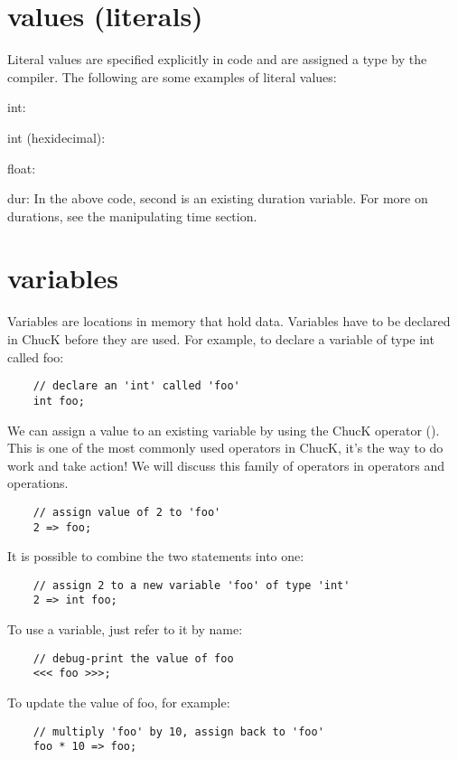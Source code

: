 \section{values (literals)}

Literal values are specified explicitly in code and are assigned a type by the compiler. The following are some examples of literal values:

int:

int (hexidecimal):

float:

dur:
 In the above code, second is an existing duration variable. For more on durations, see the manipulating time section.


\section{variables}

Variables are locations in memory that hold data. Variables have to be declared in ChucK before they are used. For example, to declare a variable of type int called foo:
\begin{verbatim}
    // declare an 'int' called 'foo'
    int foo;
\end{verbatim}

We can assign a value to an existing variable by using the ChucK operator (\chuckop). This is one of the most commonly used operators in ChucK, it's the way to do work and take action! We will discuss this family of operators in operators and operations.
\begin{verbatim}
    // assign value of 2 to 'foo'
    2 => foo;
\end{verbatim}

It is possible to combine the two statements into one:
\begin{verbatim}
    // assign 2 to a new variable 'foo' of type 'int'
    2 => int foo;
\end{verbatim}

To use a variable, just refer to it by name:
\begin{verbatim}
    // debug-print the value of foo
    <<< foo >>>;
\end{verbatim}

To update the value of foo, for example:
\begin{verbatim}
    // multiply 'foo' by 10, assign back to 'foo'
    foo * 10 => foo;
\end{verbatim}

